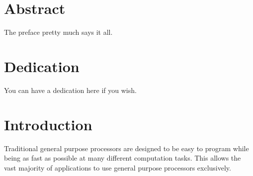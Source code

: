 \documentclass[12pt,twoside]{reedthesis}
\begin{document}
    \tableofcontents
    \listoftables
    \listoffigures

    \chapter*{Abstract}
	The preface pretty much says it all.

	\chapter*{Dedication}
	You can have a dedication here if you wish.

  \mainmatter %
  \pagestyle{fancyplain} %





\chapter*{Introduction}
\lstset{language=C++}

	
		Traditional general purpose processors are designed to be easy to program while being as fast as possible at many different computation tasks. This allows the vast majority of applications to use general purpose processors exclusively. 
		
		
\end{document}
